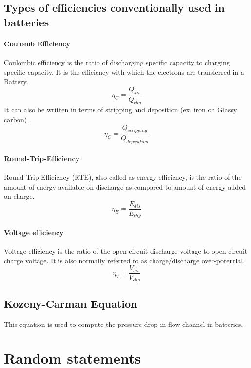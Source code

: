 \documentclass[12pt]{book}
\begin{document}
\subsection{Types of efficiencies conventionally used in batteries}
\paragraph{Coulomb Efficiency}
Coulombic efficiency is the ratio of discharging specific capacity to charging specific capacity. It is the efficiency with which the electrons are transferred in a Battery.
\begin{equation}
\eta_C = \frac{Q_{dis}}{Q_{chg}}
\end{equation}
It can also be written in terms of stripping and deposition (ex. iron on Glassy carbon) \cite{Manohar2015}.
\begin{equation}
\eta_C = \frac{Q_{stripping}}{Q_{deposition}}
\end{equation}
\paragraph{Round-Trip-Efficiency}
Round-Trip-Efficiency (RTE), also called as energy efficiency, is the ratio of the amount of energy available on discharge as compared to amount of energy added on charge.
\begin{equation}
\eta_E = \frac{E_{dis}}{E_{chg}}
\end{equation}
\paragraph{Voltage efficiency}
Voltage efficiency is the ratio of the open circuit discharge voltage to open circuit charge voltage. It is also normally referred to as charge/discharge over-potential.
\begin{equation}
\eta_V = \frac{V_{dis}}{V_{chg}}
\end{equation}
\subsection{Kozeny-Carman Equation}
This equation is used to compute the pressure drop in flow channel in batteries.


\section{Random statements}
\end{document}
